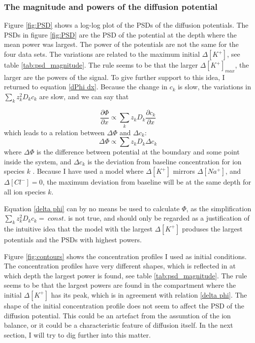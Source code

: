 \documentclass{article}
\begin{document}
\subsubsection{The magnitude and powers of the diffusion potential}
Figure \ref{fig:PSD} shows a log-log plot of the PSDs of the diffusion potentials. The PSDs in figure \ref{fig:PSD} are the PSD of the potential at the depth where the mean power was largest. The power of the potentials are not the same for the four data sets. The variations are related to the maximum initial $\Delta [K^+]$, see table \ref{tab:psd_magnitude}. The rule seems to be that the larger $\Delta [K^+]_{max}$, the larger are the powers of the signal.  To give further support to this idea, I returned to equation \ref{dPhi dx}. Because the change in $c_k$ is slow, the variations in $\sum_k z_k^2 D_k c_k$ are slow, and we can say that 

\begin{equation}
 \frac{\partial \Phi}{\partial x}  \propto { \sum_k z_k D_k \frac{\partial c_k}{\partial x} }
\end{equation}
which leads to a relation between $\Delta \Phi$ and $\Delta c_k$:
\begin{equation}\label{delta phi}
 \Delta \Phi \propto \sum z_k D_k \Delta c_k
\end{equation}
where $\Delta \Phi $ is the difference between potential at the boundary and some point inside the system, and $\Delta c_k $ is the deviation from baseline concentration for ion species $k$ . Because I have used a model where $\Delta [K^+]$ mirrors $\Delta [Na^+]$, and $\Delta [Cl^-] =0$, the maximum deviation from baseline will be at the same depth for all ion species $k$. 

Equation \ref{delta phi} can by no means be used to calculate $\Phi$, as the simplification $\sum_k z_k^2 D_k c_k =\ const.$ is not true, and should only be regarded as a justification of the intuitive idea that the model with the largest $\Delta [K^+]$ produses the largest potentials and the PSDs with highest powers. 


Figure \ref{fig:contours} shows the concentration profiles I used as initial conditions. The concentration profiles have very different shapes, which is reflected in at which depth the largest power is found, see table \ref{tab:psd_magnitude}. The rule seems to be that the largest powers are found in the compartment where the initial $\Delta [K^+]$ has its peak, which is in agreement with relation \ref{delta phi}. The shape of the initial concentration profile does not seem to affect the PSD of the diffusion potential. This could be an artefact from the assumtion of the ion balance, or it could be a characteristic feature of diffusion itself. In the next section, I will try to dig further into this matter. 
\end{document}
